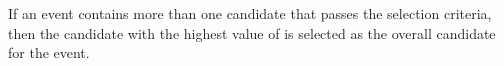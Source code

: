 If an event contains more than one \ZZ candidate that passes the selection criteria, then the candidate with the highest value of \Dkinbkg is selected as the overall \ZZ candidate for the event.

